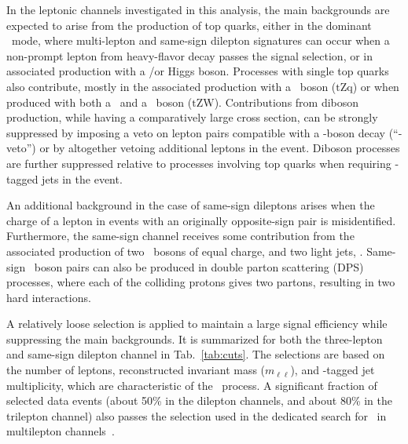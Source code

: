 In the leptonic channels investigated in this analysis, the main backgrounds are expected to arise from the production of top quarks, either in the dominant \ttbar\ mode, where multi-lepton and same-sign dilepton signatures can occur when a non-prompt lepton from heavy-flavor decay passes the signal selection, or in associated production with a \W/\Z or Higgs boson.
Processes with single top quarks also contribute, mostly in the associated production with a \Z\ boson ($\mathrm{tZq}$) or when produced with both a \W\ and a \Z\ boson ($\mathrm{tZW}$).
Contributions from diboson production, while having a comparatively large cross section, can be strongly suppressed by imposing a veto on lepton pairs compatible with a \Z-boson decay (``\Z-veto'') or by altogether vetoing additional leptons in the event.
Diboson processes are further suppressed relative to processes involving top quarks when requiring \cPqb-tagged jets in the event.

An additional background in the case of same-sign dileptons arises when the charge of a lepton in events with an originally opposite-sign pair is misidentified.
Furthermore, the same-sign channel receives some contribution from the associated production of two \PW\ bosons of equal charge, and two light jets, \WWqq.
Same-sign \PW\ boson pairs can also be produced in double parton scattering (DPS) processes, where each of the colliding protons gives two partons, resulting in two hard interactions.

A relatively loose selection is applied to maintain a large signal efficiency while suppressing the main backgrounds.
It is summarized for both the three-lepton and same-sign dilepton channel in Tab.~\ref{tab:cuts}.
The selections are based on the number of leptons, reconstructed invariant mass ($m_{\ell\ell}$), and \cPqb-tagged jet multiplicity, which are characteristic of the \tHq\ process.
A significant fraction of selected data events (about 50\% in the dilepton channels, and about 80\% in the trilepton channel) also passes the selection used in the dedicated search for \ttH\ in multilepton channels~\cite{PAS-HIG-17-004}.

